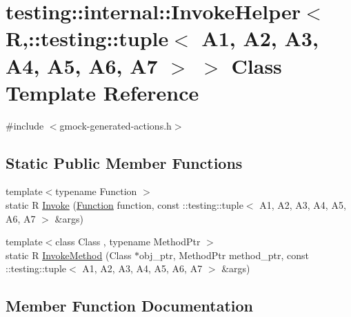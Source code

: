 \hypertarget{classtesting_1_1internal_1_1InvokeHelper_3_01R_00_1_1testing_1_1tuple_3_01A1_00_01A2_00_01A3_00_b7816aa3474ddb9fa0fd012d718c7441}{}\section{testing\+:\+:internal\+:\+:Invoke\+Helper$<$ R,\+:\+:testing\+:\+:tuple$<$ A1, A2, A3, A4, A5, A6, A7 $>$ $>$ Class Template Reference}
\label{classtesting_1_1internal_1_1InvokeHelper_3_01R_00_1_1testing_1_1tuple_3_01A1_00_01A2_00_01A3_00_b7816aa3474ddb9fa0fd012d718c7441}


{\ttfamily \#include $<$gmock-\/generated-\/actions.\+h$>$}

\subsection*{Static Public Member Functions}
\begin{DoxyCompactItemize}
\item 
{\footnotesize template$<$typename Function $>$ }\\static R \hyperlink{classtesting_1_1internal_1_1InvokeHelper_3_01R_00_1_1testing_1_1tuple_3_01A1_00_01A2_00_01A3_00_b7816aa3474ddb9fa0fd012d718c7441_accb74aec9b7c60fa12181d031d07f2c1}{Invoke} (\hyperlink{structtesting_1_1internal_1_1Function}{Function} function, const \+::testing\+::tuple$<$ A1, A2, A3, A4, A5, A6, A7 $>$ \&args)
\item 
{\footnotesize template$<$class Class , typename Method\+Ptr $>$ }\\static R \hyperlink{classtesting_1_1internal_1_1InvokeHelper_3_01R_00_1_1testing_1_1tuple_3_01A1_00_01A2_00_01A3_00_b7816aa3474ddb9fa0fd012d718c7441_a3e5707cf10af70da09223e610a7033b0}{Invoke\+Method} (Class $\ast$obj\+\_\+ptr, Method\+Ptr method\+\_\+ptr, const \+::testing\+::tuple$<$ A1, A2, A3, A4, A5, A6, A7 $>$ \&args)
\end{DoxyCompactItemize}


\subsection{Member Function Documentation}
